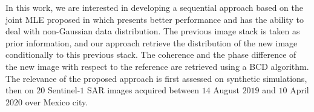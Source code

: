 In this work, we are interested in developing a sequential approach based on the joint \acs{MLE} proposed in \citep{vu2023robust} which presents better performance and has the ability to deal with non-Gaussian data distribution. The previous image stack is taken as prior information, and our approach retrieve the distribution of the new image conditionally to this previous stack. 
The coherence and the phase difference of the new image with respect to the reference are retrieved using a \ac{BCD} algorithm.
The relevance of the proposed approach is first assessed on synthetic simulations, then on $20$ Sentinel-$1$ \acs{SAR} images acquired between $14$ August $2019$ and $10$ April $2020$ over Mexico city. 

